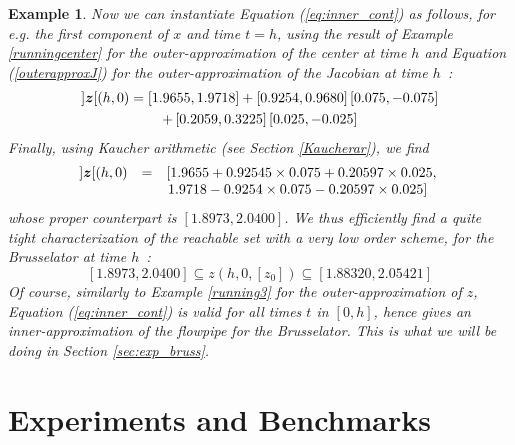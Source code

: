 \documentclass{sig-alternate-05-2015} %
\newcommand\ForAuthors[1]%
 {\par\smallskip                     %
  \begin{center}%
   \fbox%
   {\parbox{0.9\linewidth}%
    {\raggedright\sc--- #1}%
   }%
  \end{center}%
  \par\smallskip                     %
 }
\newtheorem{example}{Example}
\def\intvl#1{\mbox{$[ #1 ]$}}
\begin{document}
\begin{example}
Now we can instantiate Equation (\ref{eq:inner_cont}) as follows, for e.g. the first component of $x$ and
time $t=h$, using the result of Example \ref{runningcenter} for the outer-approximation of the center at time $h$ and
Equation (\ref{outerapproxJ}) for the outer-approximation of the Jacobian at time $h$~: 
\begin{multline}
]\z[(h,0) = \left[1.9655, 1.9718\right]+\left[0.9254, 0.9680\right]\left[0.075,-0.075\right]\\
+\left[0.2059, 0.3225\right]\left[0.025,-0.025\right]
\end{multline}
Finally, using Kaucher arithmetic (see Section \ref{Kaucherar}), we find 
$$\begin{array}{rcl}
]\z[(h,0) & = &
\left[1.9655+0.92545\times0.075+0.20597\times0.025, \right. \\
& & \left. 1.9718-0.9254\times 0.075-0.20597\times 0.025\right]
\end{array}$$
\noindent whose proper counterpart is $\left[1.8973,2.0400\right]$.
We thus efficiently find a quite tight characterization of the reachable set with a very low order scheme, for
the Brusselator at time $h$~: 
$$\left[1.8973,2.0400\right]
\subseteq z(h,0,\intvl{z_0})\subseteq \left[1.88320, 2.05421\right]$$
Of course, similarly to Example \ref{running3} for the outer-approxima\-tion of $z$, Equation (\ref{eq:inner_cont})
is valid for all times $t$ in $[0,h]$, hence gives an inner-approximation of the flowpipe for the Brusselator. This is
what we will be doing in Section \ref{sec:exp_bruss}.  
\end{example}

\section{Experiments and Benchmarks}
\label{sec:experiments}

\end{document}
